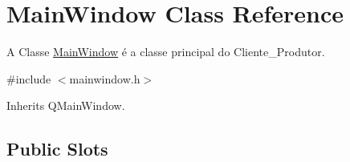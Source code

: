 \hypertarget{class_main_window}{}\section{Main\+Window Class Reference}
\label{class_main_window}


A Classe \hyperlink{class_main_window}{Main\+Window} é a classe principal do Cliente\+\_\+\+Produtor.  




{\ttfamily \#include $<$mainwindow.\+h$>$}



Inherits Q\+Main\+Window.

\subsection*{Public Slots}
